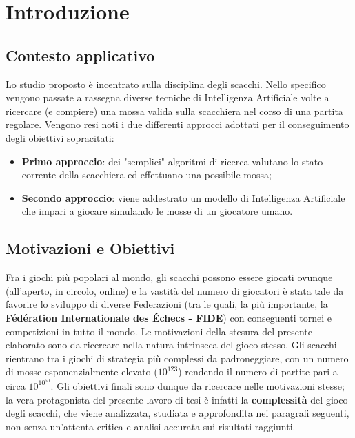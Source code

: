 \chapter{Introduzione}
\section{Contesto applicativo}
Lo studio proposto è incentrato sulla disciplina degli scacchi. Nello specifico vengono passate a rassegna diverse tecniche di 
Intelligenza Artificiale volte a ricercare (e compiere) una mossa valida sulla scacchiera nel corso di una partita regolare.
Vengono resi noti i due differenti approcci adottati per il conseguimento degli obiettivi sopracitati: 
\begin{itemize}
    \item \textbf{Primo approccio}: dei "semplici" algoritmi di ricerca valutano lo stato corrente della scacchiera ed effettuano una 
    possibile mossa;
    \item \textbf{Secondo approccio}: viene addestrato un modello di Intelligenza Artificiale che impari a giocare simulando le 
    mosse di un giocatore umano. 
\end{itemize}

\section{Motivazioni e Obiettivi} %
Fra i giochi più popolari al mondo, gli scacchi possono essere giocati ovunque (all'aperto, in circolo, online) e la vastità del numero di 
giocatori è stata tale da favorire lo sviluppo di diverse Federazioni (tra le quali, la più importante, la 
\textbf{Fédération Internationale des Échecs - FIDE}) con conseguenti tornei e competizioni in tutto il mondo. 
Le motivazioni della stesura del presente elaborato sono da ricercare nella natura intrinseca del gioco stesso. Gli scacchi rientrano
tra i giochi di strategia più complessi da padroneggiare, con un numero di mosse esponenzialmente elevato ($10^{123}$) rendendo il numero 
di partite pari a circa $10^{10^{50}}$. Gli obiettivi finali sono dunque da ricercare nelle motivazioni stesse; la vera protagonista del
presente lavoro di tesi è infatti la \textbf{complessità} del gioco degli scacchi, che viene analizzata, studiata e approfondita nei paragrafi
seguenti, non senza un'attenta critica e analisi accurata sui risultati raggiunti.

